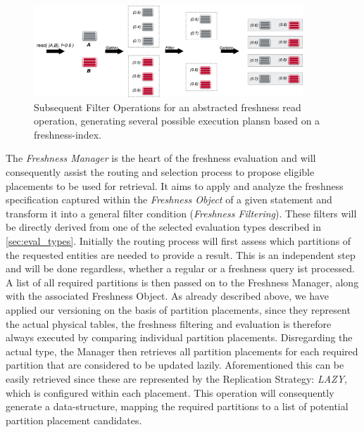 \begin{figure}[t] 
    \centering 
    \includegraphics[width=0.9\textwidth]{Figures/filter.png}
    \caption{Subsequent Filter Operations for an abstracted freshness read operation, generating several possible execution plansn based on a freshness-index.}
    \label{fig:filter}
\end{figure}

The \emph{Freshness Manager} is the heart of the freshness evaluation and will consequently assist the routing and selection process to propose eligible placements
to be used for retrieval. 
It aims to apply and analyze the freshness specification captured within the \emph{Freshness Object} of a given statement and transform it 
into a general filter condition (\emph{Freshness Filtering}). These filters will be directly derived from one of the selected evaluation types described in \ref{sec:eval_types}.
Initially the routing process will first assess which partitions of the requested entities are needed to provide a result.
This is an independent step and will be done regardless, whether a regular or a freshness query ist processed. 
A list of all required partitions is then passed on to the Freshness Manager, along with the associated Freshness Object. 
As already described above, we have applied our versioning on the basis of partition placements, since they represent the actual physical tables,
the freshness filtering and evaluation is therefore always executed by comparing individual partition placements. 
Disregarding the actual type, the Manager then retrieves all partition placements for each required partition that are considered to be updated lazily.
Aforementioned this can be easily retrieved since these are represented by the Replication Strategy: \emph{LAZY}, which is configured within each placement. 
This operation will consequently generate a data-structure, mapping the required partitions to a list of potential partition placement candidates.\\

